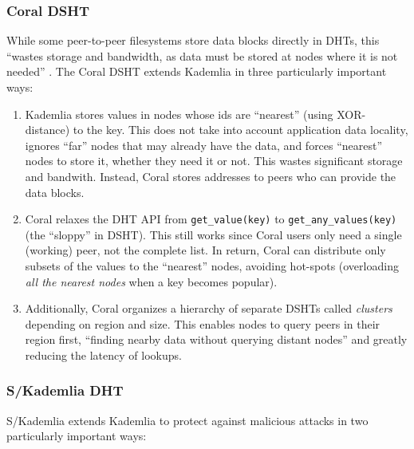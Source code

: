 \documentclass{sig-alternate}
\begin{document}
\subsubsection{Coral DSHT}

While some peer-to-peer filesystems store data blocks directly in DHTs,
this ``wastes storage and bandwidth, as data must be stored at nodes where it
is not needed'' \cite{Coral}. The Coral DSHT extends Kademlia in three
particularly important ways:

\begin{enumerate}

  \item Kademlia stores values in nodes whose ids are ``nearest'' (using
        XOR-distance) to the key. This does not take into account application
        data locality, ignores ``far'' nodes that may already have the data,
        and forces ``nearest'' nodes to store it, whether they need it or not.
        This wastes significant storage and bandwith. Instead, Coral stores
        addresses to peers who can provide the data blocks.

  \item Coral relaxes the DHT API from \texttt{get\_value(key)} to
        \texttt{get\_any\_values(key)} (the ``sloppy'' in DSHT).
        This still works since Coral users only need a single (working) peer,
        not the complete list. In return, Coral can distribute only subsets of
        the values to the ``nearest'' nodes, avoiding hot-spots (overloading
        \textit{all the nearest nodes} when a key becomes popular).

  \item Additionally, Coral organizes a hierarchy of separate DSHTs called
        \textit{clusters} depending on region and size. This enables nodes to
        query peers in their region first, ``finding nearby data without
        querying distant nodes'' \cite{Coral} and greatly reducing the latency
        of lookups.

\end{enumerate}

\subsubsection{S/Kademlia DHT}

S/Kademlia \cite{skademlia} extends Kademlia to protect against malicious attacks in two particularly important ways:
\end{document}
